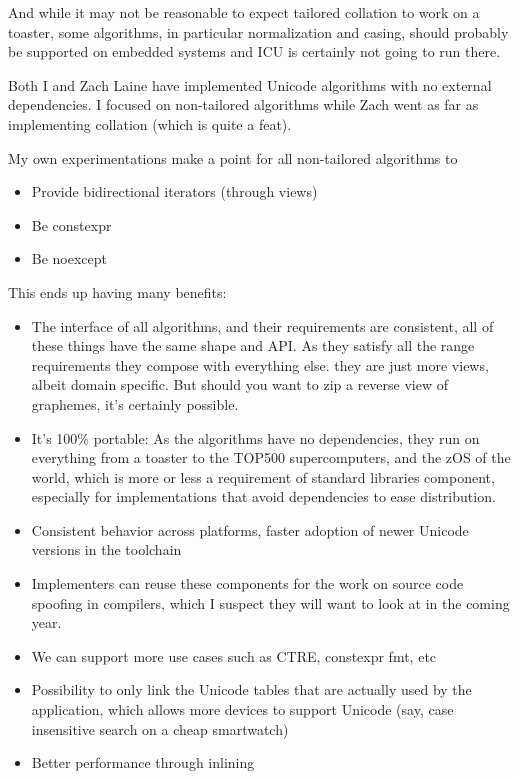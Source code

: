 \documentclass{wg21}
\begin{document}
And while it may not be reasonable to expect tailored collation to work on a toaster, some algorithms, in particular normalization and casing, should probably be supported on embedded systems and ICU is certainly not going to run there.

Both I and Zach Laine have implemented Unicode algorithms with no external dependencies. I focused on non-tailored algorithms while Zach went as far as implementing collation (which is quite a feat).

My own experimentations make a point for all non-tailored algorithms to
\begin{itemize}
\item Provide bidirectional iterators (through views)
\item Be constexpr
\item Be noexcept
\end{itemize}

This ends up having many benefits:

\begin{itemize}
\item The interface of all algorithms, and their requirements are consistent, all of these things have the same shape and API.
As they satisfy all the range requirements they compose with everything else. they are just more views, albeit domain specific. But should you want to zip a reverse view of graphemes, it's certainly possible.
\item It's 100\% portable: As the algorithms have no dependencies, they run on everything from a toaster to the TOP500 supercomputers, and the zOS of the world, which is more or less a requirement of standard libraries component, especially for implementations that avoid dependencies to ease distribution.
\item Consistent behavior across platforms, faster adoption of newer Unicode versions in the toolchain
\item Implementers can reuse these components for the work on source code spoofing in compilers, which I suspect they will want to look at in the coming year.
\item We can support more use cases such as CTRE, constexpr fmt, etc
\item Possibility to only link the Unicode tables that are actually used by the application, which allows more devices to support Unicode (say, case insensitive search on a cheap smartwatch)
\item Better performance through inlining
\end{itemize}
\end{document}
